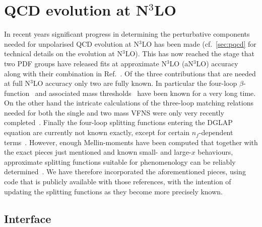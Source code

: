 
\section{QCD evolution at N$^3$LO}
\label{sec:n3lo-evolution}
In recent years significant progress in determining the perturbative
components needed for unpolarised QCD evolution at N$^3$LO has been
made (cf.\ \ref{sec:pqcd} for technical details on the evolution at
N$^3$LO).
%
This has now reached the stage that two PDF groups have released fits
at approximate N$^3$LO (aN$^3$LO)
accuracy~\cite{McGowan:2022nag,NNPDF:2024nan} along with their
combination in Ref.~\cite{Cridge:2024icl}.
%
Of the three contributions that are needed at full N$^3$LO accuracy
only two are fully known.
%
In particular the four-loop
$\beta$-function~\cite{vanRitbergen:1997va,Czakon:2004bu} and
associated mass thresholds~\cite{Chetyrkin:1997sg} have been known for
a very long time.
%
On the other hand the intricate calculations of the three-loop
matching relations needed for both the single and two mass VFNS were
only very recently
completed~\cite{Bierenbaum:2009mv,Ablinger:2010ty,Kawamura:2012cr,Blumlein:2012vq,ABLINGER2014263,Ablinger:2014nga,Ablinger:2014vwa,Behring:2014eya,Ablinger:2019etw,Behring:2021asx,Ablinger:2023ahe,Ablinger:2024xtt,Ablinger:2025awb,Behring:2025avs}.
%
Finally the four-loop splitting functions entering the DGLAP equation
are currently not known exactly, except for certain $n_f$-dependent
terms~\cite{Gracey:1994nn,Davies:2016jie,Moch:2017uml,Gehrmann:2023cqm,Falcioni:2023tzp,Gehrmann:2023iah,Kniehl:2025ttz}.
%
However, enough Mellin-moments have been computed that together with
the exact pieces just mentioned and known small- and large-$x$
behaviours, approximate splitting functions suitable for phenomenology
can be reliably
determined~\cite{McGowan:2022nag,NNPDF:2024nan,Moch:2021qrk,Falcioni:2023luc,Falcioni:2023vqq,Moch:2023tdj,Falcioni:2024xyt,Falcioni:2024qpd,Falcioni:2025hfz}.
%
We have therefore incorporated the aforementioned pieces, using code
that is publicly available with those references, with the intention of
updating the splitting functions as they become more precisely known.

\subsection{Interface}

